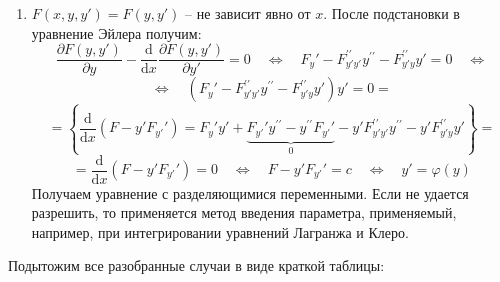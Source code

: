 \documentclass[12pt, a4paper]{article}
\newcommand{\di}{\mathrm{d}}
\begin{document}
\begin{enumerate}
 \item $F(x, y, y') = F(y, y')$ -- не зависит явно от $x$. После подстановки в уравнение Эйлера получим:
 \[\frac{\partial F(y, y')}{\partial y} - \frac{\di}{\di x} \frac{\partial F(y, y')}{\partial y'} = 0 \quad \Leftrightarrow \quad F_y' - F_{y'y'}^{\prime \prime}y^{\prime \prime} - F_{y'y}^{\prime \prime}y' = 0 \quad \Leftrightarrow \]
 \[\Leftrightarrow \quad (F_y' - F_{y'y'}^{\prime \prime}y^{\prime \prime} - F_{y'y}^{\prime \prime}y')y' = 0 = \]
 \[= \left\{ \frac{\di}{\di x} (F - y'F_{y'}') = F_y'y' + \underbrace{F_{y'}'y^{\prime \prime} - y^{\prime \prime}F_{y'}'}_0 - y'F_{y'y'}^{\prime \prime}y^{\prime \prime} - y'F_{y'y}^{\prime \prime}y' \right\} = \]
 \[= \frac{\di}{\di x} (F - y'F_{y'}') = 0 \quad \Leftrightarrow \quad F - y'F_{y'}' = c \quad \Leftrightarrow \quad y' = \varphi (y) \]
 Получаем уравнение с разделяющимися переменными. Если не удается разрешить, то применяется метод введения параметра, применяемый, например, при интегрировании уравнений Лагранжа и Клеро.
\end{enumerate}

\newpage

Подытожим все разобранные случаи в виде краткой таблицы:
\end{document}
